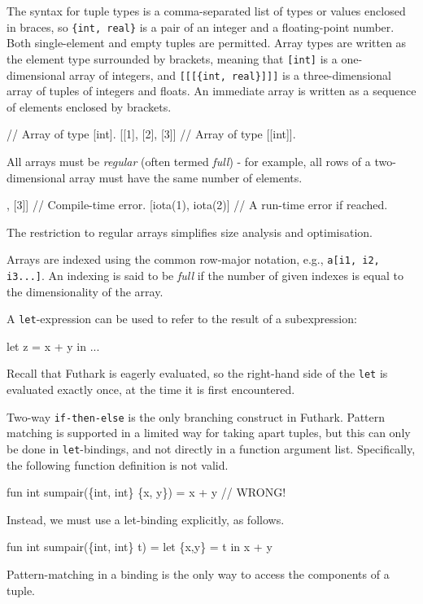\documentclass[oneside]{memoir}
\begin{document}
The syntax for tuple types is a comma-separated list of types or
values enclosed in braces, so \texttt{\{int, real\}} is a pair of an
integer and a floating-point number.  Both single-element and empty
tuples are permitted.  Array types are written as the element type
surrounded by brackets, meaning that \texttt{[int]} is a
one-dimensional array of integers, and \texttt{[[[\{int, real\}]]]} is a
three-dimensional array of tuples of integers and floats.  An
immediate array is written as a sequence of elements enclosed by
brackets.
\begin{colorcode}
  [1, 2, 3]       // Array of type [int].
  [[1], [2], [3]] // Array of type [[int]].
\end{colorcode}
All arrays must be \emph{regular} (often termed \emph{full}) - for
example, all rows of a two-dimensional array must have the same number
of elements.
\begin{colorcode}
  [[1, 2], [3]]      // Compile-time error.
  [iota(1), iota(2)] // A run-time error if reached.
\end{colorcode}
The restriction to regular arrays simplifies size analysis and
optimisation.

Arrays are indexed using the common row-major notation, e.g.,
\texttt{a[i1, i2, i3...]}.  An indexing is said to be \textit{full} if
the number of given indexes is equal to the dimensionality of the
array.

A \texttt{let}-expression can be used to refer to the result of a
subexpression:
\begin{colorcode}
  let z = x + y in ...
\end{colorcode}
Recall that Futhark is eagerly evaluated, so the right-hand side of the
\texttt{let} is evaluated exactly once, at the time it is first
encountered.

Two-way \texttt{if-then-else} is the only branching construct in Futhark.
Pattern matching is supported in a limited way for taking apart
tuples, but this can only be done in \texttt{let}-bindings, and not
directly in a function argument list.  Specifically, the following
function definition is not valid.
\begin{colorcode}
  fun int sumpair(\{int, int\} \{x, y\}) = x + y // WRONG!
\end{colorcode}
Instead, we must use a let-binding explicitly, as follows.
\begin{colorcode}
  fun int sumpair(\{int, int\} t) =
    let \{x,y\} = t in x + y
\end{colorcode}
Pattern-matching in a binding is the only way to access the components
of a tuple.
\end{document}
